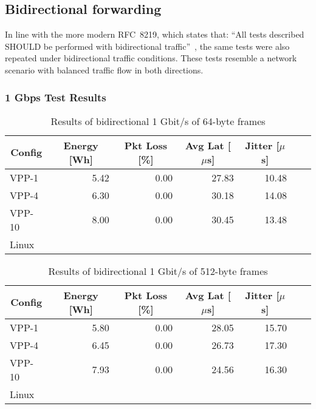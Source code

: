 \subsection{Bidirectional forwarding}

In line with the more modern RFC~8219, which states that: ``All tests described SHOULD be performed with bidirectional traffic''~\cite{RFC8219}, 
the same tests were also repeated under bidirectional traffic conditions. These tests resemble a network scenario with balanced traffic flow in both directions.

\subsubsection{1 Gbps Test Results}

\begin{table}[h!]
\centering
\caption{Results of bidirectional 1 Gbit/s of 64-byte frames}
\begin{tabular}{|l|r|r|r|r|r|r|}
\hline
\multicolumn{1}{|c|}{\textbf{Config}} &
\multicolumn{1}{c|}{\textbf{Energy [Wh] }} &
\multicolumn{1}{c|}{\textbf{Pkt Loss [\%]}} &
\multicolumn{1}{c|}{\textbf{Avg Lat [$\mu$s]}} &
\multicolumn{1}{c|}{\textbf{Jitter [$\mu$s]}} \\
\hline 
VPP-1 & 5.42 & 0.00 & 27.83 & 10.48 \\
VPP-4 & 6.30 & 0.00 & 30.18 & 14.08 \\
VPP-10 & 8.00 & 0.00 & 30.45 & 13.48 \\
Linux &  &  &  &  \\
\hline
\end{tabular}
\label{tab:1budp:64B}
\end{table}

\begin{table}[h!]
\centering
\caption{Results of bidirectional 1 Gbit/s of 512-byte frames}
\begin{tabular}{|l|r|r|r|r|r|r|}
\hline
\multicolumn{1}{|c|}{\textbf{Config}} &
\multicolumn{1}{c|}{\textbf{Energy [Wh] }} &
\multicolumn{1}{c|}{\textbf{Pkt Loss [\%]}} &
\multicolumn{1}{c|}{\textbf{Avg Lat [$\mu$s]}} &
\multicolumn{1}{c|}{\textbf{Jitter [$\mu$s]}} \\
\hline 
VPP-1 & 5.80 & 0.00 & 28.05 & 15.70 \\
VPP-4 & 6.45 & 0.00 & 26.73 & 17.30 \\
VPP-10 & 7.93 & 0.00 & 24.56 & 16.30 \\
Linux &  &  &  &  \\
\hline
\end{tabular}
\label{tab:1budp:512B}
\end{table}

